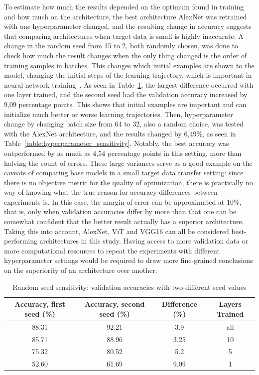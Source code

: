 \documentclass[english,twoside,openright]{UH_DS_MSc}
\begin{document}
To estimate how much the results depended on the optimum found in training and how much on the architecture, 
the best architecture AlexNet was retrained with one hyperparameter changed, and the resulting 
change in accuracy suggests that comparing architectures when target data is small is highly inaccurate. 
A change in the random seed from 15 to 2, both randomly chosen, was done to check how much the result changes 
when the only thing changed is the order of training samples in batches. This changes which initial examples are shown to the model,
changing the initial steps of the learning trajectory, which is important in neural network training~\cite{transferlearning_survey}.
 As seen in Table~\ref{table:random_seed_sensitivity}, the largest difference occurred with one layer 
trained, and the second seed had the validation accuracy increased by 9,09 percentage points. This shows that initial examples 
are important and can initialize much better or worse learning trajectories. Then, hyperparameter change 
by changing batch size from 64 to 32, also a random choice, was tested with the AlexNet architecture, and the results 
changed by 6,49\%, as seen in Table~\ref{table:hyperparameter_sensitivity}. Notably, the best accuracy was outperformed by as much as 4,54 percentage points 
in this setting, more than halving the count of errors. These large variances serve as a good example on the caveats of comparing 
base models in a small target data transfer setting: since there is no objective metric for the quality of optimization, there 
is practically no way of knowing what the true reason for accuracy differences between experiments is. In this case, the 
margin of error can be approximated at 10\%, that is, only when validation accuracies differ by more than that one can be 
somewhat confident that the better result actually has a superior architecture. Taking this into account, AlexNet, ViT and VGG16 
can all be considered best-performing architectures in this study. Having access to more validation data or more computational 
resources to repeat the experiments with different hyperparameter settings would be required to draw more fine-grained conclusions on the 
superiority of an architecture over another.

\begin{table}[ht]
    \centering
        \begin{tabular}{|c|c|c|c|}
            \hline
            \textbf{Accuracy, first seed (\%)} & \textbf{Accuracy, second seed (\%)} & \textbf{Difference (\%)} & \textbf{Layers Trained} \\ \hline
            88.31 & 92.21 & 3.9  & all \\\hline
            85.71 & 88.96 & 3.25 & 10  \\\hline
            75.32 & 80.52 & 5.2  & 5   \\\hline
            52.60 & 61.69 & 9.09 & 1   \\\hline
        \end{tabular}
    \caption{Random seed sensitivity: validation accuracies with two different seed values}
    \label{table:random_seed_sensitivity}
\end{table}
\end{document}
